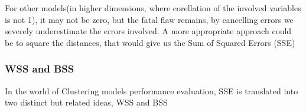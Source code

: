 \fi
For other models(in higher dimensions, where corellation of the involved variables is not 1), it may not be zero, but the fatal flaw remains, by cancelling errors we severely underestimate the errors involved. A more appropriate approach could be to square the distances, that would give us the Sum of Squared Errors (SSE)\\

\subsubsection*{WSS and BSS}
In the world of Clustering models performance evaluation, SSE is translated into two distinct but related ideas\cite{???}, WSS and BSS

